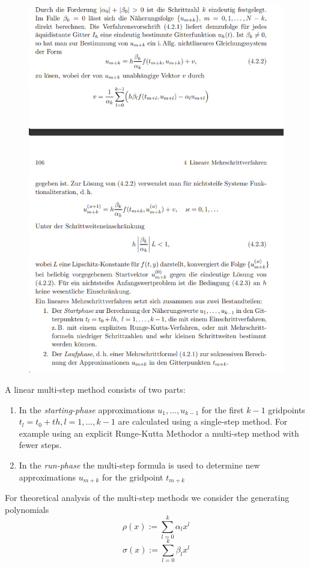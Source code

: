 \begin{figure}[H]
	\centering
	\includegraphics[width=0.7\linewidth]{screenshot010}
	\caption{}
	\label{fig:screenshot010}
\end{figure}

A linear multi-step method consists of two parts:
\begin{enumerate}
	\item In the \emph{starting-phase} approximations $u_1,...,u_{k-1}$ for the first $k-1$ gridpoints $t_l = t_0+th, l=1,...,k-1$ are calculated using a single-step method. For example using an explicit Runge-Kutta Methodor a multi-step method with fewer steps.
	
	\item  In the \emph{run-phase} the multi-step formula is used to determine new approximations $u_{m+k}$ for the gridpoint $t_{m+k}$
\end{enumerate}

For theoretical analysis of the multi-step methods we consider the generating polynomials
\begin{equation}
	\rho(x) := \sum_{l=0}^{k} \alpha_l x^l
\end{equation}
\begin{equation}
	\sigma(x) := \sum_{l=0}^{k} \beta_l x^l
\end{equation}

